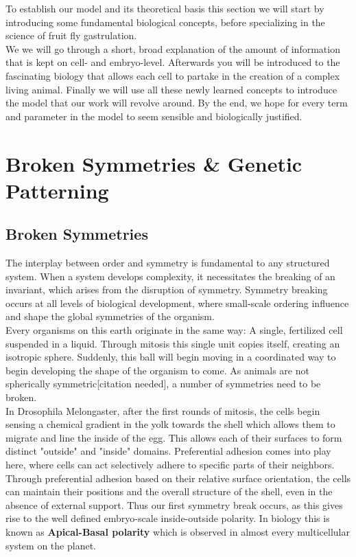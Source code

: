 To establish our model and its theoretical basis this section we will start by introducing some fundamental biological concepts, before specializing in the science of fruit fly gastrulation. \\
We we will go through a short, broad explanation of the amount of information that is kept on cell- and embryo-level. Afterwards you will be introduced to the fascinating biology that allows each cell to partake in the creation of a complex living animal. Finally we will use all these newly learned concepts to introduce the model that our work will revolve around. By the end, we hope for every term and parameter in the model to seem sensible and biologically justified. 


\section{\hspace{-0.2cm}Broken Symmetries \& Genetic Patterning}
\label{sec:theory-polarity}
\subsection{Broken Symmetries}
The interplay between order and symmetry is fundamental to any structured system. When a system develops complexity, it necessitates the breaking of an invariant, which arises from the disruption of symmetry.\cite{anderson1972more}
Symmetry breaking occurs at all levels of biological development, where small-scale ordering influence and shape the global symmetries of the organism. \\

Every organisms on this earth originate in the same way: A single, fertilized cell suspended in a liquid. Through mitosis this single unit copies itself,  creating an isotropic sphere. Suddenly, this ball will begin moving in a coordinated way to begin developing the shape of the organism to come. As animals are not spherically symmetric[citation needed], a number of symmetries need to be broken. \\

In Drosophila Melongaster, after the first rounds of mitosis, the cells begin sensing a chemical gradient in the yolk towards the shell which allows them to migrate and line the inside of the egg. This allows each of their surfaces to form distinct "outside" and "inside" domains. 
Preferential adhesion comes into play here, where cells can act selectively adhere to specific parts of their neighbors. 
Through preferential adhesion based on their relative surface orientation, the cells can maintain their positions and the overall structure of the shell, even in the absence of external support.
Thus our first symmetry break occurs, as this gives rise to the well defined embryo-scale inside-outside polarity. In biology this is known as \textbf{Apical-Basal polarity} which is observed in almost every multicellular system on the planet.\\

